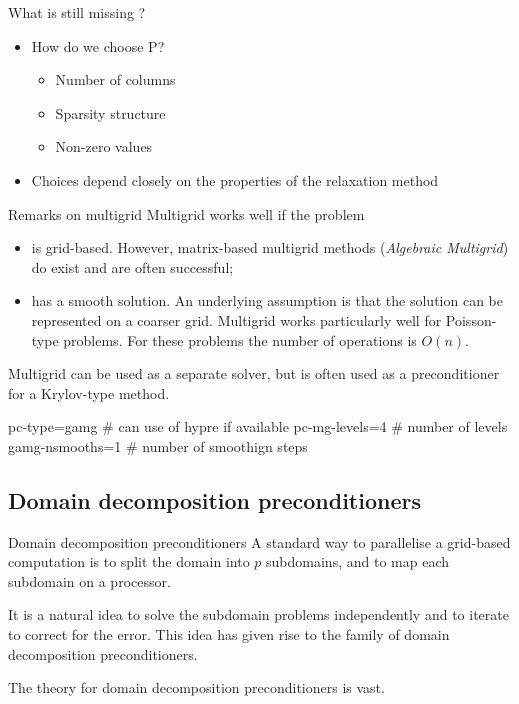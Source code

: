 \begin{frame}{What is still missing ?}
  \begin{itemize}
  \item   How do we choose P?
    \begin{itemize}
    \item Number of columns
    \item Sparsity structure
    \item Non-zero values
    \end{itemize}

 \item Choices depend closely on the properties of the relaxation
method

  \end{itemize}
\end{frame}

\begin{frame}[fragile]{Remarks on multigrid}
  Multigrid works well if the problem
  \begin{itemize}
  \item  is grid-based. However, matrix-based multigrid methods
(\emph{Algebraic Multigrid}) do exist and are often successful;
\item has a smooth solution. An underlying assumption is that the
solution can be represented on a coarser grid. Multigrid
works particularly well for Poisson-type problems. For these
problems the number of operations is $O(n).$

  \end{itemize}

Multigrid can be used as a separate solver, but is often used as
a preconditioner for a Krylov-type method.

\begin{bashcode}
  pc-type=gamg # can use of hypre if available
  pc-mg-levels=4 # number of levels
  gamg-nsmooths=1 # number of smoothign steps
\end{bashcode}
\end{frame}

\subsection{Domain decomposition preconditioners}
\begin{frame}[fragile]{Domain decomposition preconditioners}
  A standard way to parallelise a grid-based computation is to split
the domain into $p$ subdomains, and to map each subdomain on a
processor.

It is a natural idea to solve the subdomain problems
independently and to iterate to correct for the error.
This idea has given rise to the family of domain decomposition
preconditioners.

The theory for domain decomposition preconditioners is vast.

\end{frame}



